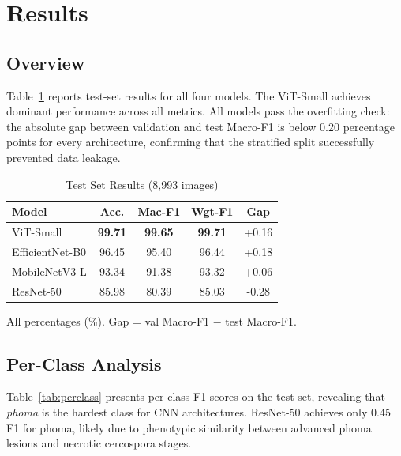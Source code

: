 \documentclass[conference]{IEEEtran}
\begin{document}
\section{Results}

\subsection{Overview}

Table~\ref{tab:testresults} reports test-set results for all four models.
The ViT-Small achieves dominant performance across all metrics. All models
pass the overfitting check: the absolute gap between validation and test
Macro-F1 is below 0.20 percentage points for every architecture, confirming
that the stratified split successfully prevented data leakage.

\begin{table}[htbp]
  \centering
  \caption{Test Set Results (8{,}993 images)}
  \label{tab:testresults}
  \begin{tabular}{lcccc}
    \toprule
    \textbf{Model} & \textbf{Acc.} & \textbf{Mac-F1} & \textbf{Wgt-F1} & \textbf{Gap} \\
    \midrule
    ViT-Small       & \textbf{99.71} & \textbf{99.65} & \textbf{99.71} & +0.16 \\
    EfficientNet-B0 & 96.45          & 95.40          & 96.44          & +0.18 \\
    MobileNetV3-L   & 93.34          & 91.38          & 93.32          & +0.06 \\
    ResNet-50       & 85.98          & 80.39          & 85.03          & -0.28 \\
    \bottomrule
  \end{tabular}
  \vspace{2pt}
  \footnotesize{All percentages (\%). Gap = val Macro-F1 $-$ test Macro-F1.}
\end{table}

\subsection{Per-Class Analysis}

Table~\ref{tab:perclass} presents per-class F1 scores on the test set,
revealing that \textit{phoma} is the hardest class for CNN architectures.
ResNet-50 achieves only 0.45 F1 for phoma, likely due to phenotypic
similarity between advanced phoma lesions and necrotic cercospora stages.
\end{document}
